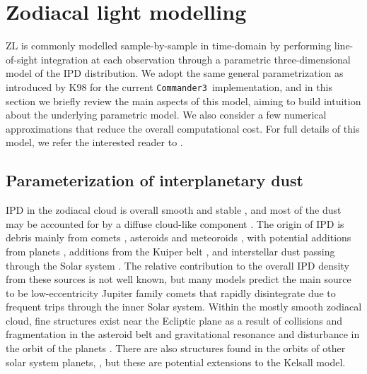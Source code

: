\documentclass[twocolumn]{aa}
\def\commanderthree{\texttt{Commander3}}
\begin{document}
\section{Zodiacal light modelling}\label{sect:zodi-model}
ZL is commonly modelled sample-by-sample in time-domain by performing
line-of-sight integration at each observation through a parametric
three-dimensional model of the IPD distribution. We adopt the same
general parametrization as introduced by K98 for the current
\commanderthree\ implementation, and in this section we briefly review
the main aspects of this model, aiming to build intuition about the
underlying parametric model. We also consider a few numerical
approximations that reduce the overall computational cost. For full
details of this model, we refer the interested reader to
\citet{Kelsall1998}.

\subsection{Parameterization of interplanetary dust}
IPD in the zodiacal cloud is overall smooth and stable 
\citep{Leinert1989}, and most of the dust may be accounted for by a 
diffuse cloud-like component \citep{Kelsall1998}. The origin of IPD 
is debris mainly from comets \citep{Liou1995, ipatov, rigley}, asteroids \citep{Dermott1984} and meteoroids \citep{dikarev}, 
with potential additions from planets \citep{Jorgensen2021}, additions from 
the Kuiper belt \citep{Mann2009}, and interstellar dust passing 
through the Solar system \citep{Robinson2013}. The relative contribution to the overall 
IPD density from these sources is not well known, but many models predict the main 
source to be low-eccentricity Jupiter family comets that rapidly 
disintegrate due to frequent trips through the inner Solar system.
Within the mostly smooth zodiacal cloud, fine structures exist near the Ecliptic plane as a result 
of collisions and fragmentation in the asteroid belt and gravitational 
resonance and disturbance in the orbit of the planets \citep{Low1984, Dermott1984, Dermott1994, Reach1997}. There are also structures found in the orbits of other solar system planets, \citep{kennedy, jones_venus, Stenborg}, but these are potential extensions to the Kelsall model.  
\end{document}

